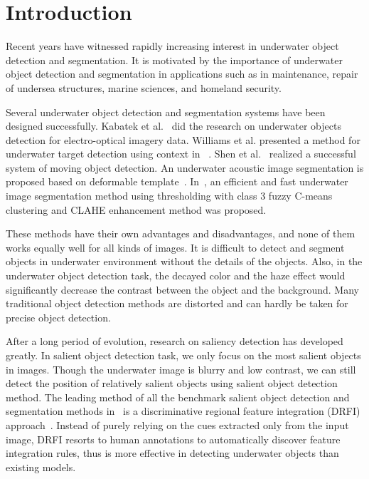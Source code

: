 \documentclass[conference]{IEEEtran}
\begin{document}




%
\IEEEpeerreviewmaketitle



\section{Introduction}
Recent years have witnessed rapidly increasing interest in underwater object detection and segmentation. It is motivated by the importance of underwater object detection and segmentation in applications such as in maintenance, repair of undersea structures, marine sciences, and homeland security.

Several underwater object detection and segmentation systems have been designed successfully. Kabatek et al.~\cite{kabatek2009underwater} did the research on underwater objects detection for electro-optical imagery data. Williams et al. presented a method for underwater target detection using context in ~\cite{williams2010using}. Shen et al.~\cite{shen2014biological} realized a successful system of moving object detection. An underwater acoustic image segmentation is proposed based on deformable template~\cite{sang2005underwater}. In~\cite{singh2014segmentation}, an efficient and fast underwater image segmentation method using thresholding with class 3 fuzzy C-means clustering and CLAHE enhancement method was proposed.

These methods have their own advantages and disadvantages, and none of them works equally well for all kinds of images. It is difficult to detect and segment objects in underwater environment without the details of the objects. Also, in the underwater object detection task, the decayed color and the haze effect would significantly decrease the contrast between the object and the background. Many traditional object detection methods are distorted and can hardly be taken for precise object detection.

After a long period of evolution, research on saliency detection has developed greatly. In salient object detection task, we only focus on the most salient objects in images. Though the underwater image is blurry and low contrast, we can still detect the position of relatively salient objects using salient object detection method. The leading method of all the benchmark salient object detection and segmentation methods in~\cite{borji2015salient} is a discriminative regional feature integration (DRFI) approach~\cite{jiang2013salient}. Instead of purely relying on the cues extracted only from the input image, DRFI resorts to human annotations to automatically discover feature integration rules, thus is more effective in detecting underwater objects than existing models.
\end{document}
